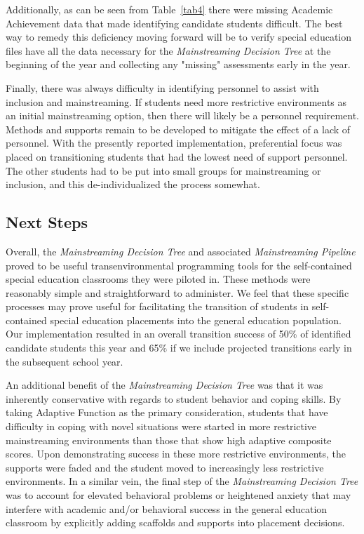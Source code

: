 \documentclass[twoside]{article}
\begin{document}
Additionally, as can be seen from Table~\ref{tab4} there were missing Academic Achievement data that made identifying candidate students difficult. The best way to remedy this deficiency moving forward will be to verify special education files have all the data necessary for the \textit{Mainstreaming Decision Tree} at the beginning of the year and collecting any "missing" assessments early in the year.

Finally, there was always difficulty in identifying personnel to assist with inclusion and mainstreaming. If students need more restrictive environments as an initial mainstreaming option, then there will likely be a personnel requirement. Methods and supports remain to be developed to mitigate the effect of a lack of personnel. With the presently reported implementation, preferential focus was placed on transitioning students that had the lowest need of support personnel. The other students had to be put into small groups for mainstreaming or inclusion, and this de-individualized the process somewhat. 

\subsection{Next Steps}
Overall, the \textit{Mainstreaming Decision Tree} and associated \textit{Mainstreaming Pipeline} proved to be useful transenvironmental programming tools for the self-contained special education classrooms they were piloted in. These methods were reasonably simple and straightforward to administer. We feel that these specific processes may prove useful for facilitating the transition of students in self-contained special education placements into the general education population. Our implementation resulted in an overall transition success of 50\% of identified candidate students this year and 65\% if we include projected transitions early in the subsequent school year. 

An additional benefit of the \textit{Mainstreaming Decision Tree} was that it was inherently conservative with regards to student behavior and coping skills. By taking Adaptive Function as the primary consideration, students that have difficulty in coping with novel situations were started in more restrictive mainstreaming environments than those that show high adaptive composite scores. Upon demonstrating success in these more restrictive environments, the supports were faded and the student moved to increasingly less restrictive environments. In a similar vein, the final step of the \textit{Mainstreaming Decision Tree} was to account for elevated behavioral problems or heightened anxiety that may interfere with academic and/or behavioral success in the general education classroom by explicitly adding scaffolds and supports into placement decisions.
\end{document}
